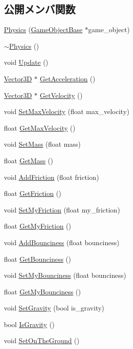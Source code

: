 \subsection*{公開メンバ関数}
\begin{DoxyCompactItemize}
\item 
\mbox{\hyperlink{class_physics_a2e4cab77c53c0acf5273bd4986f8423d}{Physics}} (\mbox{\hyperlink{class_game_object_base}{Game\+Object\+Base}} $\ast$game\+\_\+object)
\item 
\mbox{\hyperlink{class_physics_a045c3788e28059d3920136499942490f}{$\sim$\+Physics}} ()
\item 
void \mbox{\hyperlink{class_physics_a13bf3e9de07a12afc3c0a4012e00d0a1}{Update}} ()
\item 
\mbox{\hyperlink{class_vector3_d}{Vector3D}} $\ast$ \mbox{\hyperlink{class_physics_aee9ce4604f63dbdcab07ded4d0174989}{Get\+Acceleration}} ()
\item 
\mbox{\hyperlink{class_vector3_d}{Vector3D}} $\ast$ \mbox{\hyperlink{class_physics_a8e33f600575e7ee5ad348d695a9eb45e}{Get\+Velocity}} ()
\item 
void \mbox{\hyperlink{class_physics_afd9e36bb94e921a41818f261df4205d0}{Set\+Max\+Velocity}} (float max\+\_\+velocity)
\item 
float \mbox{\hyperlink{class_physics_a0ee3b82e3e1588fee1727e582c824467}{Get\+Max\+Velocity}} ()
\item 
void \mbox{\hyperlink{class_physics_a7a6eac8c5f6d7db0baef290710825085}{Set\+Mass}} (float mass)
\item 
float \mbox{\hyperlink{class_physics_a80a377efcd573cff3484d91c9f5512e4}{Get\+Mass}} ()
\item 
void \mbox{\hyperlink{class_physics_a77e9a04f034ccad4fec996832fb7ce63}{Add\+Friction}} (float friction)
\item 
float \mbox{\hyperlink{class_physics_aee1fe26db953d0712b2a26ce9d1db0d9}{Get\+Friction}} ()
\item 
void \mbox{\hyperlink{class_physics_a0e3c9825aa4129a2212c1c61d0cd6ecb}{Set\+My\+Friction}} (float my\+\_\+friction)
\item 
float \mbox{\hyperlink{class_physics_a50ad9d79f3b42a209a05f57557f294f0}{Get\+My\+Friction}} ()
\item 
void \mbox{\hyperlink{class_physics_af88191e5605a97952caefd19319b05f9}{Add\+Bounciness}} (float bounciness)
\item 
float \mbox{\hyperlink{class_physics_a5126745b31c45267ae516cc09a82fb5d}{Get\+Bounciness}} ()
\item 
void \mbox{\hyperlink{class_physics_a662185709961c64615c51ac5f32ab2ff}{Set\+My\+Bounciness}} (float bounciness)
\item 
float \mbox{\hyperlink{class_physics_acd6312afafb3faed57ba6450ed9ab9a6}{Get\+My\+Bounciness}} ()
\item 
void \mbox{\hyperlink{class_physics_a6f4c3f73eb1d2669ccc449b0d74f9d32}{Set\+Gravity}} (bool is\+\_\+gravity)
\item 
bool \mbox{\hyperlink{class_physics_a666e85a519fcb5f350a1f42273842f4d}{Is\+Gravity}} ()
\item 
void \mbox{\hyperlink{class_physics_a4e132f82ecc7f24200ec72213e2dc0c6}{Set\+On\+The\+Ground}} ()
\end{DoxyCompactItemize}
